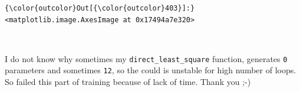 \documentclass[11pt]{article}
\begin{document}
\begin{Verbatim}[commandchars=\\\{\}]
{\color{outcolor}Out[{\color{outcolor}403}]:} <matplotlib.image.AxesImage at 0x17494a7e320>
\end{Verbatim}
            
    \begin{center}
    \end{center}
    { \hspace*{\fill} \\}
    
    I do not know why sometimes my \texttt{direct\_least\_square} function,
generates \texttt{0} parameters and sometimes \texttt{12}, so the could
is unstable for high number of loops. So failed this part of training
because of lack of time. Thank you ;-)


    
    
    
    
\end{document}
